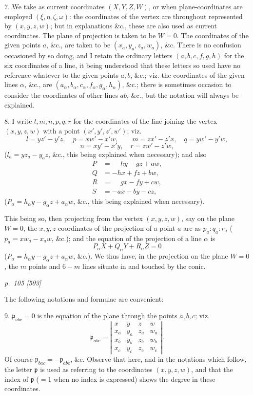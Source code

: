 \documentclass[11pt,a4paper]{article}
\newcommand{\sourcepage}[2]{%
  \bigskip
  \noindent\textit{p.~#1 [#2]}%
  \par\smallskip
}
\newcommand{\Det}[1]{\left|\begin{matrix}#1\end{matrix}\right|}
\newcommand{\p}{\mathfrak p}
\begin{document}
7. We take as current coordinates $(X,Y,Z,W)$, or when plane-coordinates are
employed $(\xi,\eta,\zeta,\omega)$: the coordinates of the vertex are throughout
represented by $(x,y,z,w)$; but in explanations \&c., these are also used as current
coordinates. The plane of projection is taken to be $W=0$. The coordinates of the
given points $a$, \&c., are taken to be $(x_a,y_a,z_a,w_a)$, \&c. There is no
confusion occasioned by so doing, and I retain the ordinary letters $(a,b,c,f,g,h)$
for the six coordinates of a line, it being understood that these letters so used have
no reference whatever to the given points $a,b$, \&c.; viz. the coordinates of the
given lines $\alpha$, \&c., are
$(a_\alpha,b_\alpha,c_\alpha,f_\alpha,g_\alpha,h_\alpha)$, \&c.; there is sometimes
occasion to consider the coordinates of other lines $ab$, \&c., but the notation will
always be explained.

8. I write $l,m,n,p,q,r$ for the coordinates of the line joining the vertex
$(x,y,z,w)$ with a point $(x',y',z',w')$; viz.
\[
l=yz'-y'z,\quad p=xw'-x'w,\qquad
m=zx'-z'x,\quad q=yw'-y'w,
\]
\[
n=xy'-x'y,\quad r=zw'-z'w,
\]
($l_a=yz_a-y_az$, \&c., this being explained when necessary); and also
\[
\begin{aligned}
P&=\phantom{-}hy-gz+aw,\\
Q&=-hx+fz+bw,\\
R&=\phantom{-}gx-fy+cw,\\
S&=-ax-by-cz,
\end{aligned}
\]
($P_\alpha=h_\alpha y-g_\alpha z+a_\alpha w$, \&c., this being explained when
necessary).

This being so, then projecting from the vertex $(x,y,z,w)$, say on the plane $W=0$,
the $x,y,z$ coordinates of the projection of a point $a$ are as
$p_a:q_a:r_a$ ($p_a=xw_a-x_aw$, \&c.); and the equation of the projection of a line
$\alpha$ is
\[
P_\alpha X+Q_\alpha Y+R_\alpha Z=0
\]
($P_\alpha=h_\alpha y-g_\alpha z+a_\alpha w$, \&c.). We thus have, in the projection
on the plane $W=0$, the $m$ points and $6-m$ lines situate in and touched by the conic.

\sourcepage{105}{503}
The following notations and formulae are convenient:

9. $\p_{abc}=0$ is the equation of the plane through the points $a,b,c$; viz.
\[
\p_{abc}=\Det{
x&y&z&w\\
x_a&y_a&z_a&w_a\\
x_b&y_b&z_b&w_b\\
x_c&y_c&z_c&w_c}.
\]
Of course $\p_{bac}=-\p_{abc}$, \&c. Observe that here, and in the notations which
follow, the letter $\p$ is used as referring to the coordinates $(x,y,z,w)$, and that
the index of $\p$ ($=1$ when no index is expressed) shows the degree in these
coordinates.
\end{document}
